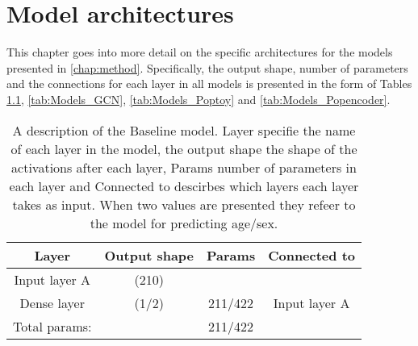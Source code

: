 \chapter{Model architectures}
\label{app:model_training}

This chapter goes into more detail on the specific architectures for the models presented in \cref{chap:method}. Specifically, the output shape, number of parameters and the connections for each layer in all models is presented in the form of Tables \ref{tab:Models_Baseline}, \ref{tab:Models_GCN}, \ref{tab:Models_Poptoy} and \ref{tab:Models_Popencoder}.

\begin{table}[H]
    \centering
    \caption{A description of the Baseline model. Layer specifie the name of each layer in the model, the output shape the shape of the activations after each layer, Params number of parameters in each layer and Connected to descirbes which layers each layer takes as input. When two values are presented they refeer to the model for predicting age/sex. }
    \begin{tabular}{c|c c c}
         Layer & Output shape & Params & Connected to\\ \hline\hline
         Input layer A &(210) & & \\ \hline
         Dense layer & (1/2) & 211/422 & Input layer A \\ \hline\hline
         Total params:& & 211/422
    \end{tabular}
    \label{tab:Models_Baseline}
\end{table}

